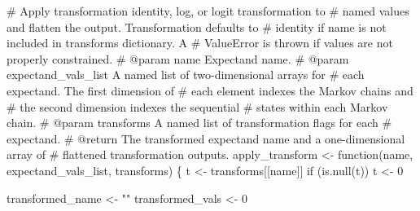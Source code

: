 \documentclass[
  letterpaper,
  DIV=11,
  numbers=noendperiod]{scrartcl}
\newenvironment{Shaded}{\begin{snugshade}}{\end{snugshade}}
\newcommand{\CommentTok}[1]{\textcolor[rgb]{0.37,0.37,0.37}{#1}}
\newcommand{\ControlFlowTok}[1]{\textcolor[rgb]{0.00,0.23,0.31}{#1}}
\newcommand{\DecValTok}[1]{\textcolor[rgb]{0.68,0.00,0.00}{#1}}
\newcommand{\KeywordTok}[1]{\textcolor[rgb]{0.00,0.23,0.31}{#1}}
\newcommand{\NormalTok}[1]{\textcolor[rgb]{0.00,0.23,0.31}{#1}}
\newcommand{\OperatorTok}[1]{\textcolor[rgb]{0.37,0.37,0.37}{#1}}
\newcommand{\StringTok}[1]{\textcolor[rgb]{0.13,0.47,0.30}{#1}}
\begin{document}
\begin{Shaded}
\begin{Highlighting}[]
\CommentTok{\# Apply transformation identity, log, or logit transformation to}
\CommentTok{\# named values and flatten the output.  Transformation defaults to}
\CommentTok{\# identity if name is not included in \textasciigrave{}transforms\textasciigrave{} dictionary.  A }
\CommentTok{\# ValueError is thrown if values are not properly constrained.}
\CommentTok{\# @param name Expectand name.}
\CommentTok{\# @param expectand\_vals\_list A named list of two{-}dimensional arrays for}
\CommentTok{\#                            each expectand.  The first dimension of}
\CommentTok{\#                            each element indexes the Markov chains and}
\CommentTok{\#                            the second dimension indexes the sequential}
\CommentTok{\#                            states within each Markov chain.}
\CommentTok{\# @param transforms A named list of transformation flags for each }
\CommentTok{\#                   expectand.}
\CommentTok{\# @return The transformed expectand name and a one{-}dimensional array of}
\CommentTok{\#         flattened transformation outputs.}
\NormalTok{apply\_transform }\OperatorTok{\textless{}{-}}\NormalTok{ function(name, expectand\_vals\_list, transforms) \{}
\NormalTok{  t }\OperatorTok{\textless{}{-}}\NormalTok{ transforms[[name]]}
  \ControlFlowTok{if}\NormalTok{ (}\KeywordTok{is}\NormalTok{.null(t)) t }\OperatorTok{\textless{}{-}} \DecValTok{0}
  
\NormalTok{  transformed\_name }\OperatorTok{\textless{}{-}} \StringTok{""}
\NormalTok{  transformed\_vals }\OperatorTok{\textless{}{-}} \DecValTok{0}
 

\end{Highlighting}
\end{Shaded}
\end{document}
